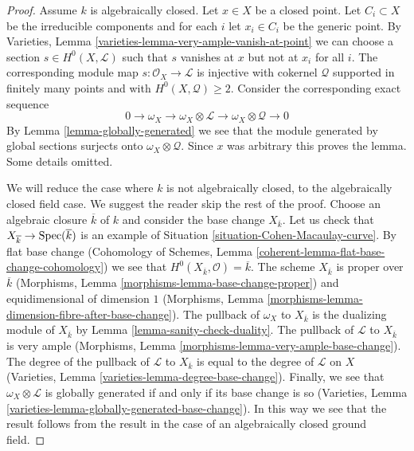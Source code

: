 \begin{proof}
Assume $k$ is algebraically closed. Let $x \in X$ be a closed point.
Let $C_i \subset X$ be the irreducible components and for each $i$
let $x_i \in C_i$ be the generic point. By
Varieties, Lemma \ref{varieties-lemma-very-ample-vanish-at-point}
we can choose a section $s \in H^0(X, \mathcal{L})$ such that $s$
vanishes at $x$ but not at $x_i$ for all $i$. The corresponding
module map $s : \mathcal{O}_X \to \mathcal{L}$ is injective with
cokernel $\mathcal{Q}$ supported in finitely many points and
with $H^0(X, \mathcal{Q}) \geq 2$. Consider the corresponding
exact sequence
$$
0 \to \omega_X \to \omega_X \otimes \mathcal{L} \to
\omega_X \otimes \mathcal{Q} \to 0
$$
By Lemma \ref{lemma-globally-generated} we see that the module generated
by global sections surjects onto $\omega_X \otimes \mathcal{Q}$.
Since $x$ was arbitrary this proves the lemma. Some details omitted.

\medskip\noindent
We will reduce the case where $k$ is not algebraically closed, to
the algebraically closed field case. We suggest the reader skip
the rest of the proof. Choose an algebraic closure $\overline{k}$
of $k$ and consider the base change $X_{\overline{k}}$. Let us
check that $X_{\overline{k}} \to \mathop{\mathrm{Spec}}(\overline{k})$ is an example
of Situation \ref{situation-Cohen-Macaulay-curve}. By flat base change
(Cohomology of Schemes, Lemma \ref{coherent-lemma-flat-base-change-cohomology})
we see that $H^0(X_{\overline{k}}, \mathcal{O}) = \overline{k}$.
The scheme $X_{\overline{k}}$ is proper over $\overline{k}$ (Morphisms,
Lemma \ref{morphisms-lemma-base-change-proper}) and
equidimensional of dimension $1$
(Morphisms, Lemma \ref{morphisms-lemma-dimension-fibre-after-base-change}).
The pullback of $\omega_X$ to $X_{\overline{k}}$ is the dualizing
module of $X_{\overline{k}}$ by Lemma \ref{lemma-sanity-check-duality}.
The pullback of $\mathcal{L}$ to $X_{\overline{k}}$ is very ample
(Morphisms, Lemma \ref{morphisms-lemma-very-ample-base-change}).
The degree of the pullback of $\mathcal{L}$ to $X_{\overline{k}}$
is equal to the degree of $\mathcal{L}$ on $X$ (Varieties, Lemma
\ref{varieties-lemma-degree-base-change}). Finally, we see that
$\omega_X \otimes \mathcal{L}$ is globally generated if and only
if its base change is so
(Varieties, Lemma \ref{varieties-lemma-globally-generated-base-change}).
In this way we see that the result follows from the result in the
case of an algebraically closed ground field.
\end{proof}




